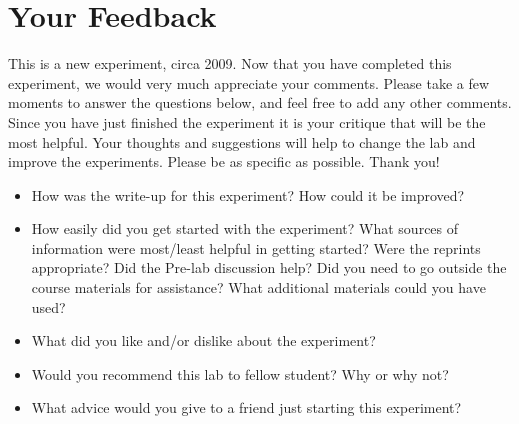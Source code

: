 \documentclass{../lab}
\begin{document}
\section{Your Feedback}

This is a new experiment, circa 2009. Now that you have completed this experiment, we would very much appreciate your comments. Please take a few moments to answer the questions below, and feel free to add any other comments. Since you have just finished the experiment it is your critique that will be the most helpful. Your thoughts and suggestions will help to change the lab and improve the experiments. Please be as specific as possible. Thank you!

\begin{itemize}
    \item How was the write-up for this experiment? How could it be improved?

    \item How easily did you get started with the experiment? What sources of information were most/least helpful in getting started? Were the reprints appropriate? Did the Pre-lab discussion help? Did you need to go outside the course materials for assistance? What additional materials could you have used?

    \item What did you like and/or dislike about the experiment?

    \item Would you recommend this lab to fellow student? Why or why not?

    \item What advice would you give to a friend just starting this experiment?
\end{itemize}
\end{document}
